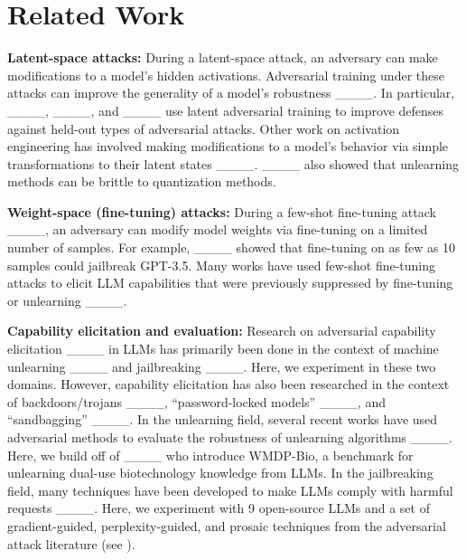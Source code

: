 \section{Related Work}
\textbf{Latent-space attacks:} 
During a latent-space attack, an adversary can make modifications to a model's hidden activations.
Adversarial training under these attacks can improve the generality of a model's robustness ____.
In particular, ____, ____, and ____ use latent adversarial training to improve defenses against held-out types of adversarial attacks. 
Other work on activation engineering has involved making modifications to a model's behavior via simple transformations to their latent states ____. ____ also showed that unlearning methods can be brittle to quantization methods. 

\textbf{Weight-space (fine-tuning) attacks:} During a few-shot fine-tuning attack ____, an adversary can modify model weights via fine-tuning on a limited number of samples. 
For example, ____ showed that fine-tuning on as few as 10 samples could jailbreak GPT-3.5.
Many works have used few-shot fine-tuning attacks to elicit LLM capabilities that were previously suppressed by fine-tuning or unlearning ____.

\textbf{Capability elicitation and evaluation:} 
Research on adversarial capability elicitation ____ in LLMs has primarily been done in the context of machine unlearning ____ and jailbreaking ____. 
Here, we experiment in these two domains. However, capability elicitation has also been researched in the context of backdoors/trojans ____, ``password-locked models'' ____, and ``sandbagging'' ____.
In the unlearning field, several recent works have used adversarial methods to evaluate the robustness of unlearning algorithms ____.
Here, we build off of ____ who introduce WMDP-Bio, a benchmark for unlearning dual-use biotechnology knowledge from LLMs. 
In the jailbreaking field, many techniques have been developed to make LLMs comply with harmful requests ____.
Here, we experiment with 9 open-source LLMs and a set of gradient-guided, perplexity-guided, and prosaic techniques from the adversarial attack literature (see ).


